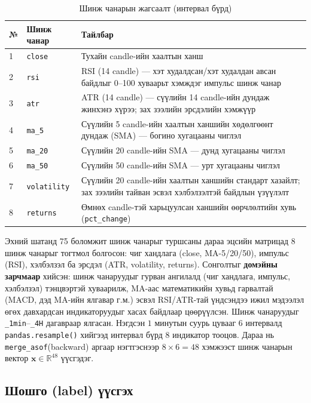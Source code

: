 \begin{table}[H]
\centering
\caption{Шинж чанарын жагсаалт (интервал бүрд)}
\label{tab:features}
\begin{tabularx}{\textwidth}{|l|l|>{\raggedright\arraybackslash}X|}
\hline
\textbf{№} & \textbf{Шинж чанар} & \textbf{Тайлбар}  \\ \hline
1 & \texttt{close}      & Тухайн candle-ийн хаалтын ханш \\ \hline
2 & \texttt{rsi}    & RSI (14 candle) --- хэт худалдсан/хэт худалдан авсан байдлыг 0--100 хуваарьт хэмждэг импульс шинж чанар \\ \hline
3 & \texttt{atr}    & ATR (14 candle) --- сүүлийн 14 candle-ийн дундаж жинхэнэ хүрээ; зах зээлийн эрсдэлийн хэмжүүр \\ \hline
4 & \texttt{ma\_5}      & Сүүлийн 5 candle-ийн хаалтын ханшийн хөдөлгөөнт дундаж (SMA) --- богино хугацааны чиглэл \\ \hline
5 & \texttt{ma\_20}     & Сүүлийн 20 candle-ийн SMA --- дунд хугацааны чиглэл \\ \hline
6 & \texttt{ma\_50}     & Сүүлийн 50 candle-ийн SMA --- урт хугацааны чиглэл \\ \hline
7 & \texttt{volatility} & Сүүлийн 20 candle-ийн хаалтын ханшийн стандарт хазайлт; зах зээлийн тайван эсвэл хэлбэлзэлтэй байдлын үзүүлэлт \\ \hline
8 & \texttt{returns}    & Өмнөх candle-тэй харьцуулсан ханшийн өөрчлөлтийн хувь (\texttt{pct\_change}) \\ \hline
\end{tabularx}
\end{table}

Эхний шатанд 75 боломжит шинж чанарыг туршсаны дараа эцсийн матрицад 8 шинж чанарыг тогтмол болгосон: чиг хандлага (close, MA-5/20/50), импульс (RSI), хэлбэлзэл ба эрсдэл (ATR, volatility, returns). Сонголтыг \textbf{домэйны зарчмаар} хийсэн: шинж чанаруудыг гурван ангилалд (чиг хандлага, импульс, хэлбэлзэл) тэнцвэртэй хуваарилж, MA-аас математикийн хувьд гарвалтай (MACD, дэд MA-ийн ялгавар г.м.) эсвэл RSI/ATR-тай үндсэндээ ижил мэдээлэл өгөх давхардсан индикаторуудыг хасах байдлаар цөөрүүлсэн. Шинж чанаруудыг \texttt{\_1min}–\texttt{\_4H} дагавраар ялгасан. Нэгдсэн $1$ минутын суурь цувааг 6 интервалд \texttt{pandas.resample()} хийгээд интервал бүрд 8 индикатор тооцов. Дараа нь \texttt{merge\_asof}(backward) аргаар нэгтгэснээр $8 \times 6 = 48$ хэмжээст шинж чанарын вектор $\mathbf{x}\in\mathbb{R}^{48}$ үүсгэдэг.

\subsection{Шошго (label) үүсгэх}

